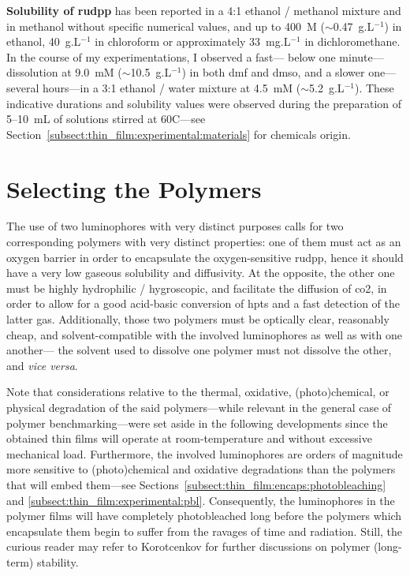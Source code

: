 \textbf{Solubility of \gls{rudpp}} has been reported in a 4:1 ethanol / methanol mixture\cite{alford1985} and in methanol\cite{demas1977} without specific numerical values, and up to 400~{\textmu}M ($\sim$0.47~g.L$^{-1}$) in ethanol\cite{baker2000}, 40~g.L$^{-1}$ in chloroform\cite{khan2015} or approximately 33~mg.L$^{-1}$ in dichloromethane\cite{xu1994}. In the course of my experimentations, I observed a fast---\ie{} below one minute---dissolution at 9.0~mM ($\sim$10.5~g.L$^{-1}$) in both \gls{dmf} and \gls{dmso}, and a slower one---\ie{} several hours---in a 3:1 ethanol / water mixture at 4.5~mM ($\sim$5.2~g.L$^{-1}$). These indicative durations and solubility values were observed during the preparation of 5--10~mL of solutions stirred at 60{\degree}C---see Section~\ref{subsect:thin_film:experimental:materials} for chemicals origin.

\section{Selecting the Polymers}\label{sect:thin_film:select_poly}

The use of two luminophores with very distinct purposes calls for two corresponding polymers with very distinct properties: one of them must act as an oxygen barrier in order to encapsulate the oxygen-sensitive \gls{rudpp}, hence it should have a very low gaseous solubility and diffusivity. At the opposite, the other one must be highly hydrophilic / hygroscopic, and facilitate the diffusion of \gls{co2}, in order to allow for a good acid-basic conversion of \gls{hpts} and a fast detection of the latter gas. Additionally, those two polymers must be optically clear, reasonably cheap, and solvent-compatible with the involved luminophores as well as with one another---\ie{} the solvent used to dissolve one polymer must not dissolve the other, and \textit{vice versa}.

Note that considerations relative to the thermal, oxidative, (photo)chemical, or physical degradation of the said polymers---while relevant in the general case of polymer benchmarking---were set aside in the following developments since the obtained thin films will operate at room-temperature and without excessive mechanical load. Furthermore, the involved luminophores are orders of magnitude more sensitive to (photo)chemical and oxidative degradations than the polymers that will embed them---see Sections~\ref{subsect:thin_film:encaps:photobleaching} and \ref{subsect:thin_film:experimental:pbl}. Consequently, the luminophores in the polymer films will have completely photobleached long before the polymers which encapsulate them begin to suffer from the ravages of time and radiation. Still, the curious reader may refer to Korotcenkov for further discussions on polymer (long-term) stability\cite[Chap.~9]{korotcenkov2014}.

